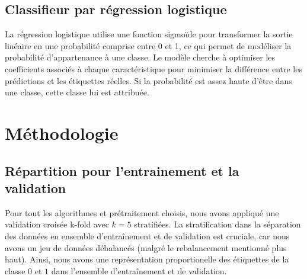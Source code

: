 \documentclass{article}
\begin{document}
\subsection{Classifieur par régression logistique}
La régression logistique utilise une fonction sigmoïde pour transformer la sortie linéaire en une probabilité comprise entre 0 et 1, ce qui permet de modéliser la probabilité d'appartenance à une classe. Le modèle cherche à optimiser les coefficients associés à chaque caractéristique pour minimiser la différence entre les prédictions et les étiquettes réelles. Si la probabilité est assez haute d'être dans une classe, cette classe lui est attribuée.

\section{Méthodologie}
\subsection{Répartition pour l'entrainement et la validation}
Pour tout les algorithmes et prétraitement choisis, nous avons appliqué une validation croisée k-fold avec $k = 5$ stratifiées. La stratification dans la séparation des données en ensemble d'entraînement et de validation est cruciale, car nous avons un jeu de données débalancés (malgré le rebalancement mentionné plus haut). Ainsi, nous avons une représentation proportionelle des étiquettes de la classe $0$ et $1$ dans l'ensemble d'entraînement et de validation.
\end{document}

